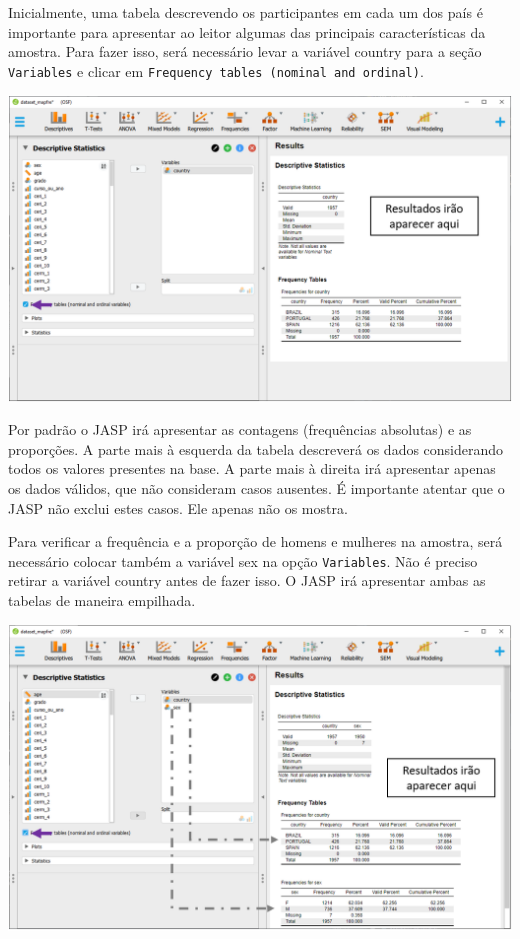 \documentclass[
]{book}
\begin{document}
Inicialmente, uma tabela descrevendo os participantes em cada um dos país é importante para apresentar ao leitor algumas das principais características da amostra. Para fazer isso, será necessário levar a variável country para a seção \texttt{Variables} e clicar em \texttt{Frequency\ tables\ (nominal\ and\ ordinal)}.

\includegraphics{./img/cap_desc_jasp_proporcao.png}

Por padrão o JASP irá apresentar as contagens (frequências absolutas) e as proporções. A parte mais à esquerda da tabela descreverá os dados considerando todos os valores presentes na base. A parte mais à direita irá apresentar apenas os dados válidos, que não consideram casos ausentes. É importante atentar que o JASP não exclui estes casos. Ele apenas não os mostra.

Para verificar a frequência e a proporção de homens e mulheres na amostra, será necessário colocar também a variável sex na opção \texttt{Variables}. Não é preciso retirar a variável country antes de fazer isso. O JASP irá apresentar ambas as tabelas de maneira empilhada.

\includegraphics{./img/cap_desc_jasp_proporcao_duas_variaveis.png}
\end{document}

